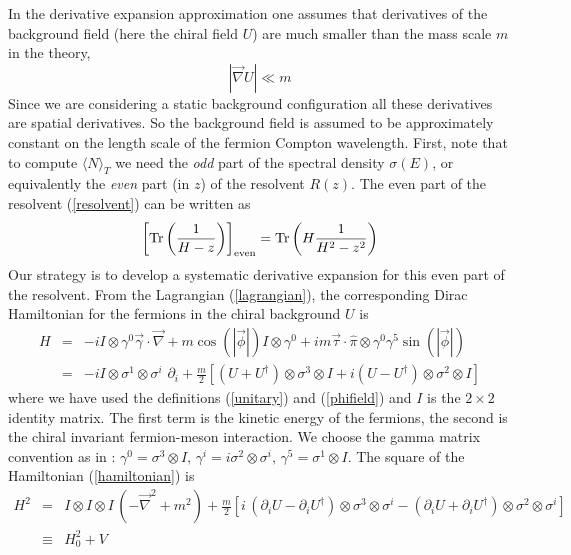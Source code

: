 \documentclass[a4paper,prd,showpacs,showkeys]{revtex4}
\begin{document}
In the derivative expansion approximation \cite{wilczek,dhoker,derivative} one assumes that
derivatives of the background field (here the chiral field $U$) are much smaller than the mass scale $m$ in the theory,
\begin{equation}
|\vec{\nabla} U| \ll m
\label{condition}
\end{equation}
Since we are considering a static background configuration all these derivatives are spatial derivatives.  So the background field is assumed to be approximately constant on the length scale of the fermion Compton wavelength. First, note that to compute $\langle N\rangle _T$ we need the {\it odd} part of the spectral density $\sigma(E)$, or equivalently the {\it even} part (in $z$) of the resolvent  $R(z)$. The even part of the resolvent (\ref{resolvent}) can be written as
\begin{equation}
\left[\textrm{Tr} \left(\frac{1}{H-z}\right) \right]_{\rm{even}} =\textrm{Tr} \left(H \frac{1}{H^2-z^2}\right)
\label{reven}
\end{equation}
Our strategy is to develop a systematic derivative expansion for this even part of the resolvent.
From the Lagrangian (\ref{lagrangian}), the corresponding Dirac Hamiltonian for the fermions in the chiral background $U$ is
\begin{eqnarray}
H&=&-i I \otimes \gamma^0 \vec{\gamma} \cdot \vec{\nabla} +m \cos (|\vec{\phi}|) I \otimes \gamma^0 +i m \vec{\tau}\cdot \hat{\pi} \otimes \gamma^0 \gamma^5 \sin (|\vec{\phi}|) \nonumber  \\
&=& -i I \otimes \sigma^1 \otimes \sigma^i \, \, \partial_i +\frac{m}{2} \left[(U+U^\dagger) \otimes \sigma^3 \otimes I +i (U-U^\dagger) \otimes \sigma^2 \otimes I\right]
\label{hamiltonian}
\end{eqnarray}
where we have used the definitions (\ref{unitary}) and (\ref{phifield}) and $I$ is the $2 \times 2$ identity matrix. The first term is the kinetic energy of the fermions, the second is the chiral invariant fermion-meson interaction. We choose the gamma matrix  convention as in \cite{niemi}: $\gamma^0=\sigma^3 \otimes I,\,  \gamma^i=i \sigma^2 \otimes \sigma^i,\,  \gamma^5= \sigma^1 \otimes I$. The square of the Hamiltonian (\ref{hamiltonian}) is 
\begin{eqnarray}
H^2&=&I \otimes I \otimes I \,(-\vec{\nabla}^2 +m^2) +\frac{m}{2} \left[i \, (\partial_i U -\partial_i U^{\dagger}) \otimes \sigma^3 \otimes \sigma^i - (\partial_i U +\partial_i U^{\dagger}) \otimes \sigma^2 \otimes \sigma^i\right] \nonumber  \\
& \equiv & H_{0}^2 +V
\end{eqnarray}
\end{document}

